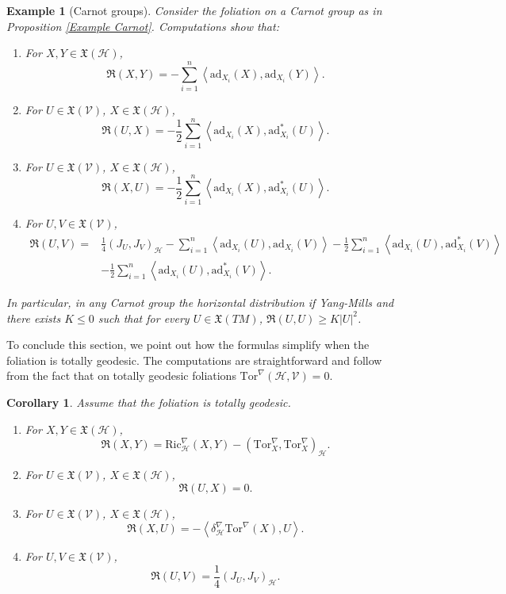 \documentclass[11pt]{article}
\numberwithin{equation}{section}
\newtheorem{corollary}[theorem]{Corollary}
\newtheorem{example}[theorem]{Example}
\newcommand{\Ho}{\mathcal H}
\newcommand{\V}{\mathcal V}
\newcommand{\Tor}{\mathrm{Tor}}
\begin{document}
\begin{example}[Carnot groups]
Consider the foliation on a Carnot group as in Proposition \ref{Example Carnot}. Computations show that:
\begin{enumerate}
\item For $X,Y \in \mathfrak{X}(\Ho)$,
\[
\mathfrak{R}(X,Y)=-\sum_{i=1}^n \left\langle \mathrm{ad}_{X_i} (X),  \mathrm{ad}_{X_i} (Y) \right\rangle.
\]
\item For $U \in \mathfrak{X}(\V)$, $X \in \mathfrak{X}(\Ho)$,
\[
\mathfrak{R}(U,X)=-\frac{1}{2} \sum_{i=1}^n \left\langle \mathrm{ad}_{X_i} (X),  \mathrm{ad}^*_{X_i} (U) \right\rangle .
\]
\item For $U \in \mathfrak{X}(\V)$, $X \in \mathfrak{X}(\Ho)$,
\[
\mathfrak{R}(X,U)=-\frac{1}{2} \sum_{i=1}^n \left\langle \mathrm{ad}_{X_i} (X),  \mathrm{ad}^*_{X_i} (U) \right\rangle .
\]
\item  For $U,V \in \mathfrak{X}(\V)$, 
\begin{align*}
\mathfrak{R}(U,V)= &\frac{1}{4}(J_U,J_V)_\Ho-\sum_{i=1}^n \left\langle \mathrm{ad}_{X_i} (U),  \mathrm{ad}_{X_i} (V) \right\rangle -\frac{1}{2}\sum_{i=1}^n \left\langle \mathrm{ad}_{X_i} (U),  \mathrm{ad}^*_{X_i} (V) \right\rangle \\
 &-\frac{1}{2}\sum_{i=1}^n \left\langle \mathrm{ad}_{X_i} (U),  \mathrm{ad}^*_{X_i} (V) \right\rangle.
\end{align*}
\end{enumerate}
In particular, in any Carnot group the horizontal distribution if Yang-Mills and there exists $K \le 0$ such that for every $U \in \mathfrak{X}(TM)$, $\mathfrak{R}(U,U) \ge K |U|^2$.
\end{example}

To conclude this section, we point out how the formulas simplify when the foliation is totally geodesic. The computations are straightforward and follow from the fact that on totally geodesic foliations $\Tor^\nabla (\Ho,\V) =0$.

\begin{corollary}
Assume that the foliation is totally geodesic.
\begin{enumerate}
\item For $X,Y \in \mathfrak{X}(\Ho)$,
\[
\mathfrak{R}(X,Y)=\mathrm{Ric}^\nabla_\Ho(X,Y)-(\Tor^\nabla_X ,\Tor^\nabla_X)_\Ho .
\]
\item For $U \in \mathfrak{X}(\V)$, $X \in \mathfrak{X}(\Ho)$,
\[
\mathfrak{R}(U,X)=0 .
\]
\item For $U \in \mathfrak{X}(\V)$, $X \in \mathfrak{X}(\Ho)$,
\[
\mathfrak{R}(X,U)=-\left\langle \delta_\Ho^\nabla \Tor^\nabla (X),U \right\rangle .
\]
\item  For $U,V \in \mathfrak{X}(\V)$, 
\[
\mathfrak{R}(U,V)=\frac{1}{4}(J_U,J_V)_\Ho .
\]

\end{enumerate}

\end{corollary}
\end{document}
